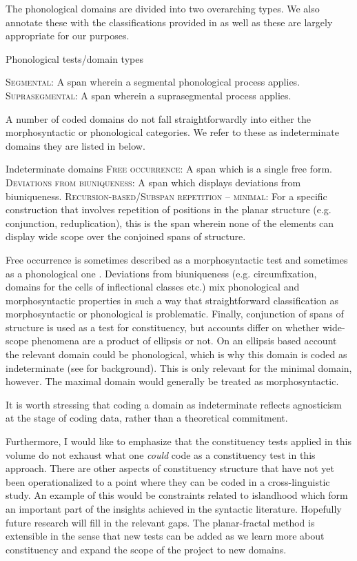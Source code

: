\documentclass[output=paper,hidelinks]{langscibook}
\begin{document}
The phonological domains are divided into two overarching types. We also annotate these with the classifications provided in \citet{bickeletal:2007} as well as these are largely appropriate for our purposes.

\ea Phonological tests/domain types \label{list:phontests}

    \ea  \textsc{Segmental}: A span wherein a segmental phonological process applies.
    \ex  \textsc{Suprasegmental}: A span wherein a suprasegmental process applies.
    \z 
\z 

A number of coded domains do not fall straightforwardly into either the morphosyntactic or phonological categories. We refer to these as indeterminate domains they are listed in  below.

\ea Indeterminate domains \label{list:indeterminatedomains}
    \ea  \textsc{Free occurrence}: A span which is a single free form.
    \ex \textsc{Deviations from biuniqueness}: A span which displays deviations from biuniqueness.
    \ex \textsc{Recursion-based/Subspan repetition -- minimal}: For a specific construction that involves repetition of positions in the planar structure (e.g. conjunction, reduplication), this is the span wherein none of the elements can display wide scope over the conjoined spans of structure.
    \z
\z 

Free occurrence is sometimes described as a morphosyntactic test \citep{haspelmathword:2011} and sometimes as a phonological one \citep{zingler2020wordhood}. Deviations from biuniqueness (e.g. circumfixation, domains for the cells of inflectional classes etc.) mix phonological and morphosyntactic properties in such a way that straightforward classification as morphosyntactic or phonological is problematic. Finally, conjunction of spans of structure is used as a test for constituency, but accounts differ on whether wide-scope phenomena are a product of ellipsis or not. On an ellipsis based account the relevant domain could be phonological, which is why this domain is coded as indeterminate (see \cite{osborne2006shared} for background). This is only relevant for the minimal domain, however. The maximal domain would generally be treated as morphosyntactic.

It is worth stressing that coding a domain as indeterminate reflects agnosticism at the stage of coding data, rather than a theoretical commitment. 

Furthermore, I would like to emphasize that the constituency tests applied in this volume do not exhaust what one \textit{could} code as a constituency test in this approach. There are other aspects of constituency structure that have not yet been operationalized to a point where they can be coded in a cross-linguistic study. An example of this would be constraints related to islandhood which form an important part of the insights achieved in the syntactic literature. Hopefully future research will fill in the relevant gaps. The planar-fractal method is extensible in the sense that new tests can be added as we learn more about constituency and expand the scope of the project to new domains.
\end{document}
